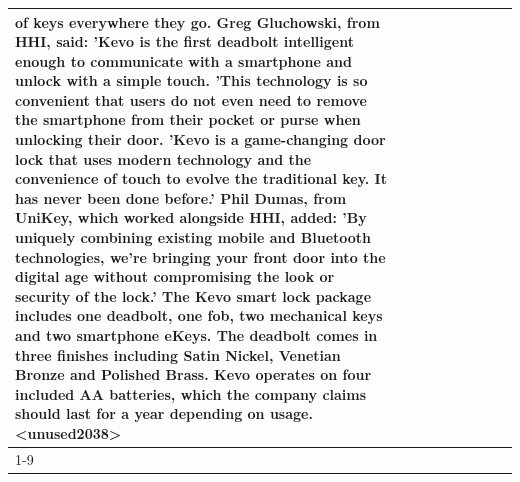 \begin{table}[H]
\begin{tabular}{lllrlllll}
of keys everywhere they go. Greg Gluchowski, from HHI, said: 'Kevo is the first deadbolt intelligent enough to communicate with a smartphone and unlock with a simple touch. 'This technology is so convenient that users do not even need to remove the smartphone from their pocket or purse when unlocking their door. 'Kevo is a game-changing door lock that uses modern technology and the convenience of touch to evolve the traditional key. It has never been done before.' Phil Dumas, from UniKey, which worked alongside HHI, added: 'By uniquely combining existing mobile and Bluetooth technologies, we’re bringing your front door into the digital age without compromising the look or security of the lock.' The Kevo smart lock package includes one deadbolt, one fob, two mechanical keys and two smartphone eKeys. The deadbolt comes in three finishes including Satin Nickel, Venetian Bronze and Polished Brass. Kevo operates on four included AA batteries, which the company claims should last for a year depending on usage.<unused2038> \\
\cline{1-9}

\end{tabular}
\end{table}
